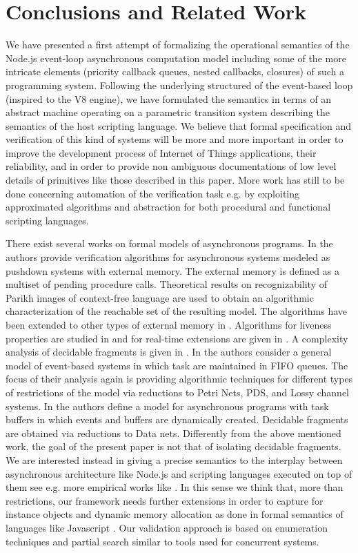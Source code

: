 %
\section{Conclusions and Related Work}
\label{sec:csr}
We have presented a first attempt of formalizing the operational semantics of the Node.js event-loop asynchronous computation model including some of the more intricate elements (priority callback queues, nested callbacks, closures) of such a programming system.
Following the underlying structured of the event-based loop (inspired to the V8 engine), we have formulated the semantics in terms of an  abstract machine operating on a parametric transition system describing the semantics of the host scripting language. We believe that formal specification and verification of this kind of systems will be more and more important in order to improve the development process of Internet of Things applications, their reliability, and in order to provide non ambiguous documentations of low level details of primitives like those described in this paper. More work has still to be done concerning automation of the verification task e.g. by exploiting approximated algorithms and abstraction for both procedural and functional scripting languages.

There exist several works on formal models of asynchronous programs. 
In \cite{SV06} the authors provide verification algorithms for asynchronous systems modeled as pushdown systems with external memory. The external memory is defined as a multiset of pending procedure calls. Theoretical results on recognizability of Parikh images of context-free language are used to obtain an algorithmic characterization of the reachable set of the resulting model.
The algorithms have been extended to other types of external memory in \cite{CV07}.
Algorithms for liveness properties are studied in \cite{GMR09} and for real-time extensions are given in  \cite{GM09}. A complexity analysis of decidable fragments is given in \cite{GM12}. In \cite{GHR15} the authors consider a general model of event-based systems in which task are maintained in FIFO queues. The focus of their analysis again is providing algorithmic techniques for  different types of restrictions of the model  via reductions to Petri Nets, PDS, and Lossy channel systems. In \cite{EGMR15} the authors define a model for asynchronous programs with task buffers in which events and buffers are dynamically created. Decidable fragments are obtained via reductions to Data nets. 
Differently from the above mentioned work, the goal of the present paper is not that of isolating decidable fragments. We are interested instead in giving a precise semantics to the interplay between  asynchronous architecture like Node.js and scripting languages executed on top of them see e.g. more empirical works like \cite{ASOP16,GMB15}. In this sense we think that, more than restrictions, our framework needs further extensions in order to  capture for instance objects and dynamic memory allocation as done in formal semantics of languages like Javascript \cite{PSR15}. Our validation approach is based on enumeration techniques and partial search similar to tools used for concurrent systems.
